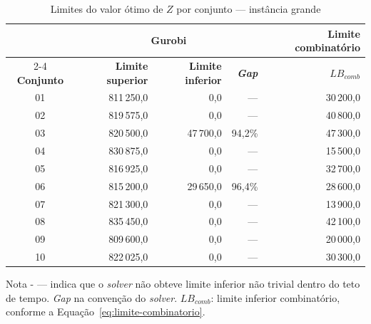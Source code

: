 \begin{table}[H]
    \caption{Limites do valor ótimo de $Z$ por conjunto --- instância grande}
    \label{tab:res-limites-grande}
    \centering
    \begin{tabular}{crrrr}
        \hline
        & \multicolumn{3}{c}{\textbf{Gurobi}} & \textbf{Limite combinatório} \\
        \cline{2-4} \cline{5-5}
        \textbf{Conjunto} & \textbf{Limite superior} & \textbf{Limite inferior} & \textbf{\textit{Gap}} & \textbf{$LB_{comb}$} \\
        \hline
        01 & 811\,250,0 & 0,0 & --- & 30\,200,0 \\
        02 & 819\,575,0 & 0,0 & --- & 40\,800,0 \\
        03 & 820\,500,0 & 47\,700,0 & 94,2\% & 47\,300,0 \\
        04 & 830\,875,0 & 0,0 & --- & 15\,500,0 \\
        05 & 816\,925,0 & 0,0 & --- & 32\,700,0 \\
        06 & 815\,200,0 & 29\,650,0 & 96,4\% & 28\,600,0 \\
        07 & 821\,300,0 & 0,0 & --- & 13\,900,0 \\
        08 & 835\,450,0 & 0,0 & --- & 42\,100,0 \\
        09 & 809\,600,0 & 0,0 & --- & 20\,000,0 \\
        10 & 822\,025,0 & 0,0 & --- & 30\,300,0 \\
        \hline
    \end{tabular}
    \par\smallskip
    {\footnotesize Nota - --- indica que o \textit{solver} não obteve limite inferior não trivial dentro do teto de tempo. \textit{Gap} na convenção do \textit{solver}. $LB_{comb}$: limite inferior combinatório, conforme a Equação~\eqref{eq:limite-combinatorio}.}
\end{table}

